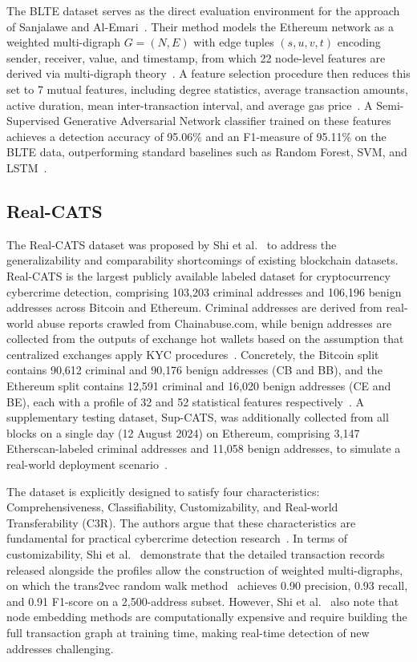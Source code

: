 \documentclass{thesisclass}
\begin{document}
The BLTE dataset serves as the direct evaluation environment for the
approach of Sanjalawe and Al-Emari~\cite{sanjalawe2023atd}.
Their method models the Ethereum network as a weighted multi-digraph
\(G = (N, E)\) with edge tuples \((s, u, v, t)\) encoding sender, receiver,
value, and timestamp, from which 22 node-level features are derived via
multi-digraph theory~\cite{sanjalawe2023atd}.
A feature selection procedure then reduces this set to
7 mutual features, including degree statistics, average transaction amounts,
active duration, mean inter-transaction interval, and average gas
price~\cite{sanjalawe2023atd}.
A Semi-Supervised Generative Adversarial Network classifier trained on these
features achieves a detection accuracy of 95.06\% and an F1-measure of 95.11\%
on the BLTE data, outperforming standard baselines such as Random Forest, SVM,
and LSTM~\cite{sanjalawe2023atd}.

\subsection*{Real-CATS}

The Real-CATS dataset was proposed by Shi et al.~\cite{shi2025realcats} to address
the generalizability and comparability shortcomings of existing blockchain datasets.
Real-CATS is the largest publicly available labeled dataset for cryptocurrency
cybercrime detection, comprising 103{,}203 criminal addresses and 106{,}196 benign
addresses across Bitcoin and Ethereum.
Criminal addresses are derived from real-world abuse reports crawled from
Chainabuse.com, while benign addresses are collected from the outputs of exchange
hot wallets based on the assumption that centralized exchanges apply KYC
procedures~\cite{shi2025realcats}.
Concretely, the Bitcoin split contains 90{,}612 criminal and 90{,}176 benign
addresses (CB and BB), and the Ethereum split contains 12{,}591 criminal and
16{,}020 benign addresses (CE and BE), each with a profile of 32 and 52 statistical
features respectively~\cite{shi2025realcats}.
A supplementary testing dataset, Sup-CATS, was additionally collected from all
blocks on a single day (12 August 2024) on Ethereum, comprising 3{,}147
Etherscan-labeled criminal addresses and 11{,}058 benign addresses, to simulate a
real-world deployment scenario~\cite{shi2025realcats}.

The dataset is explicitly designed to satisfy four characteristics: Comprehensiveness,
Classifiability, Customizability, and Real-world Transferability (C3R).
The authors argue that these characteristics are fundamental for practical cybercrime detection
research~\cite{shi2025realcats}.
In terms of customizability, Shi et al.~\cite{shi2025realcats} demonstrate that
the detailed transaction records released alongside the profiles allow the
construction of weighted multi-digraphs, on which the trans2vec random walk
method~\cite{wu2020phishers} achieves 0.90 precision, 0.93 recall, and 0.91
F1-score on a 2{,}500-address subset.
However, Shi et al.~\cite{shi2025realcats} also note that node embedding methods
are computationally expensive and require building the full transaction graph at training
time, making real-time detection of new addresses challenging.
\end{document}
